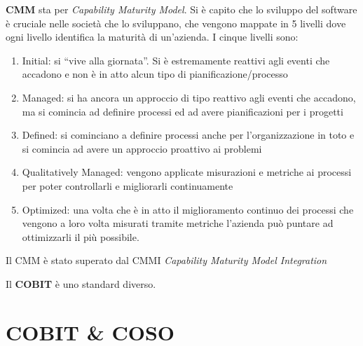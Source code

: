 \textbf{CMM} sta per \textit{Capability Maturity Model}. Si è capito che lo 
sviluppo del software è cruciale nelle società che lo sviluppano, che vengono 
mappate in 5 livelli dove ogni livello identifica la maturità di un'azienda.
I cinque livelli sono:
\begin{enumerate}
 \item Initial: si ``vive alla giornata''. Si è estremamente reattivi agli 
eventi che accadono e non è in atto alcun tipo di pianificazione/processo
 \item Managed: si ha ancora un approccio di tipo reattivo agli eventi che 
accadono, ma si comincia ad definire processi ed ad avere pianificazioni per i 
progetti
 \item Defined: si cominciano a definire processi anche per l'organizzazione in 
toto e si comincia ad avere un approccio proattivo ai problemi
 \item Qualitatively Managed: vengono applicate misurazioni e metriche ai 
processi per poter controllarli e migliorarli continuamente
 \item Optimized: una volta che è in atto il miglioramento continuo dei 
processi che vengono a loro volta misurati tramite metriche l'azienda può 
puntare ad ottimizzarli il più possibile.
\end{enumerate}
Il CMM è stato superato dal CMMI \textit{Capability Maturity Model Integration}


Il \textbf{COBIT} è uno standard diverso.

\section{COBIT \& COSO}

